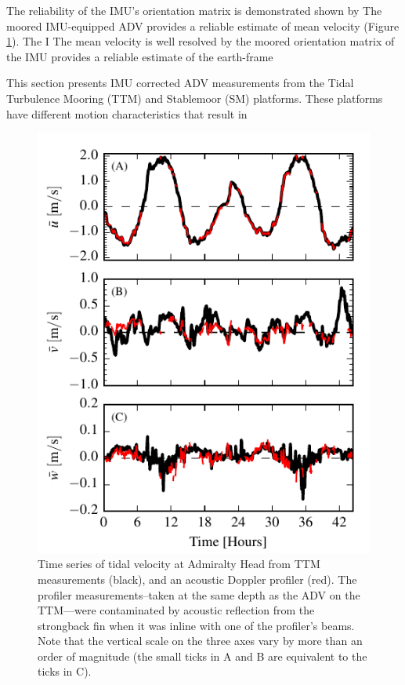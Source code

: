 \documentclass[twocol]{ametsoc}
\begin{document}
The reliability of the IMU's orientation matrix is demonstrated shown by 
The moored IMU-equipped ADV provides a reliable estimate of mean velocity (Figure \ref{fig:vel_time}).  The I
The mean velocity is well resolved by the moored orientation matrix of the IMU provides a reliable estimate of the earth-frame

This section presents IMU corrected ADV measurements from the Tidal Turbulence Mooring (TTM) and Stablemoor (SM) platforms. These platforms have different motion characteristics that result in  \cite{Harding_MotionPaper}

\begin{figure}[t]
  \centering
  \includegraphics{TimeFig02}
  \caption{Time series of tidal velocity at Admiralty Head from TTM measurements (black), and an acoustic Doppler profiler (red). The profiler measurements--taken at the same depth as the ADV on the TTM---were contaminated by acoustic reflection from the strongback fin when it was inline with one of the profiler's beams. Note that the vertical scale on the three axes vary by more than an order of magnitude (the small ticks in A and B are equivalent to the ticks in C).}
  \label{fig:vel_time}
\end{figure}
\end{document}
